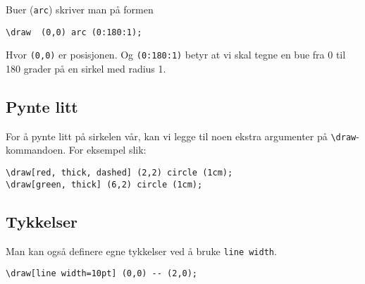 \documentclass[11pt, a4paper]{article}
\begin{document}
\noindent Buer (\texttt{arc}) skriver man på formen

\begin{Verbatim}[fontsize=\small]
\draw  (0,0) arc (0:180:1);
\end{Verbatim}
Hvor \texttt{(0,0)} er posisjonen. Og \texttt{(0:180:1)} betyr at vi skal tegne en bue fra 0 til 180 grader på en sirkel med radius 1.

\newpage 

\subsection{Pynte litt}
For å pynte litt på sirkelen vår, kan vi legge til noen ekstra argumenter på \texttt{\textbackslash draw}-kommandoen. For eksempel slik:
\begin{center}
\end{center}

\begin{Verbatim}[fontsize=\small]
\draw[red, thick, dashed] (2,2) circle (1cm);
\draw[green, thick] (6,2) circle (1cm);
\end{Verbatim}

\subsection{Tykkelser}
\begin{minipage}{0.4\textwidth}
\end{minipage}
\begin{minipage}{0.5\textwidth}
\noindent Man kan også definere egne tykkelser ved å bruke \texttt{line width}.
\begin{center}
\end{center}
\begin{Verbatim}[fontsize=\small]
\draw[line width=10pt] (0,0) -- (2,0);
\end{Verbatim}
\end{minipage}
\end{document}
